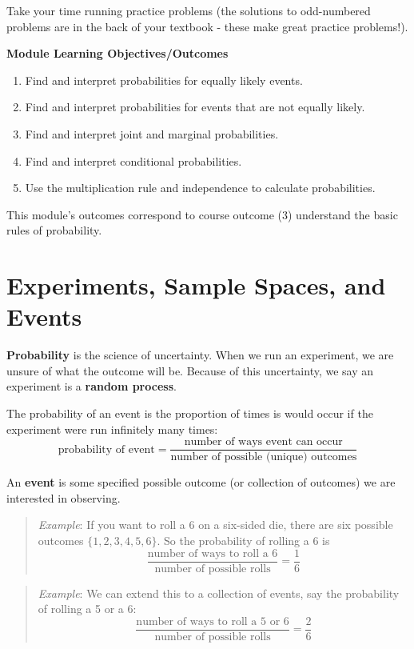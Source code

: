 \documentclass[
]{book}
\providecommand{\tightlist}{%
  \setlength{\itemsep}{0pt}\setlength{\parskip}{0pt}}
\begin{document}
Take your time running practice problems (the solutions to odd-numbered problems are in the back of your textbook - these make great practice problems!).

\textbf{Module Learning Objectives/Outcomes}

\begin{enumerate}
\def\labelenumi{\arabic{enumi}.}
\tightlist
\item
  Find and interpret probabilities for equally likely events.
\item
  Find and interpret probabilities for events that are not equally likely.
\item
  Find and interpret joint and marginal probabilities.
\item
  Find and interpret conditional probabilities.
\item
  Use the multiplication rule and independence to calculate probabilities.
\end{enumerate}

This module's outcomes correspond to course outcome (3) understand the basic rules of probability.

\hypertarget{experiments-sample-spaces-and-events}{%
\section{Experiments, Sample Spaces, and Events}\label{experiments-sample-spaces-and-events}}

\textbf{Probability} is the science of uncertainty. When we run an experiment, we are unsure of what the outcome will be. Because of this uncertainty, we say an experiment is a \textbf{random process}.

The probability of an event is the proportion of times is would occur if the experiment were run infinitely many times:
\[
  \text{probability of event} = \frac{\text{number of ways event can occur}}{\text{number of possible (unique) outcomes}}
\]

An \textbf{event} is some specified possible outcome (or collection of outcomes) we are interested in observing.

\begin{quote}
\emph{Example}: If you want to roll a 6 on a six-sided die, there are six possible outcomes \(\{1,2,3,4,5,6\}\). So the probability of rolling a 6 is
\[
\frac{\text{number of ways to roll a 6}}{\text{number of possible rolls}} = \frac{1}{6}
\]
\end{quote}

\begin{quote}
\emph{Example}: We can extend this to a collection of events, say the probability of rolling a 5 or a 6:
\[
\frac{\text{number of ways to roll a 5 or 6}}{\text{number of possible rolls}} = \frac{2}{6}
\]
\end{quote}
\end{document}
